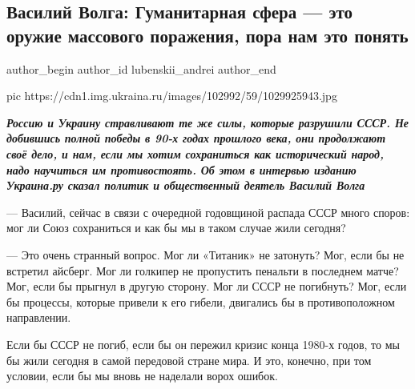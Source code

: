  
 
 
 
 
 
\subsection{Василий Волга: Гуманитарная сфера — это оружие массового поражения, пора нам это понять}
\label{sec:13_12_2020.news.ru.ukraina_ru.lubenskii_andrei.1.humanitarnaja_sfera_oruzhie}
\ifcmt
	author_begin
   author_id lubenskii_andrei
	author_end
\fi


\ifcmt
pic https://cdn1.img.ukraina.ru/images/102992/59/1029925943.jpg
\fi

\begin{leftbar}
	\begingroup
\large\em
\textbf{Россию и Украину стравливают те же силы, которые разрушили СССР. Не добившись
полной победы в 90-х годах прошлого века, они продолжают своё дело, и нам, если
мы хотим сохраниться как исторический народ, надо научиться им противостоять.
Об этом в интервью изданию Украина.ру сказал политик и общественный деятель
Василий Волга}
	\endgroup
\end{leftbar}

— Василий, сейчас в связи с очередной годовщиной распада СССР много споров: мог
ли Союз сохраниться и как бы мы в таком случае жили сегодня?

— Это очень странный вопрос. Мог ли «Титаник» не затонуть? Мог, если бы не
встретил айсберг. Мог ли голкипер не пропустить пенальти в последнем матче?
Мог, если бы прыгнул в другую сторону. Мог ли СССР не погибнуть? Мог, если бы
процессы, которые привели к его гибели, двигались бы в противоположном
направлении.

Если бы СССР не погиб, если бы он пережил кризис конца 1980-х годов, то мы бы
жили сегодня в самой передовой стране мира. И это, конечно, при том условии,
если бы мы вновь не наделали ворох ошибок.

